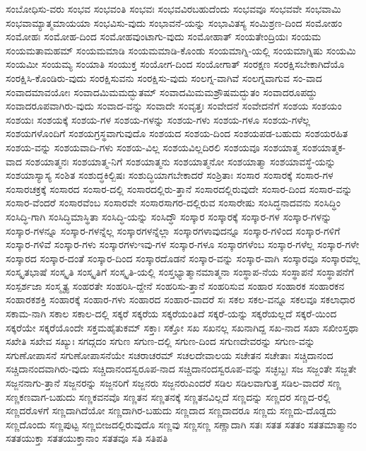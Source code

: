 {ಸಂಬೋಧಿಸು-ವರು
ಸಂಭವ
ಸಂಭವಂತಿ
ಸಂಭವಃ
ಸಂಭವವಿರಬಹುದೆಂದು
ಸಂಭವವೂ
ಸಂಭವವೇ
ಸಂಭವಾಮಿ
ಸಂಭವಾಮ್ಯಾತ್ಮಮಾಯಯಾ
ಸಂಭವಿಸು-ವುದು
ಸಂಭಾವನೆ-ಯನ್ನು
ಸಂಭಾವಿತಸ್ಯ
ಸಂಮಿಶ್ರಣ-ದಿಂದ
ಸಂಮೋಹಂ
ಸಂಮೋಹಃ
ಸಂಮೋಹ-ದಿಂದ
ಸಂಮೋಹವುಂಟಾಗು-ವುದು
ಸಂಮೋಹಾತ್
ಸಂಯತೇಂದ್ರಿಯಃ
ಸಂಯಮ
ಸಂಯಮತಾಮಹಮ್
ಸಂಯಮಮಾಡಿ
ಸಂಯಮಮಾಡಿ-ಕೊಂಡು
ಸಂಯಮಾಗ್ನಿ-ಯಲ್ಲಿ
ಸಂಯಮಾಗ್ನಿಷು
ಸಂಯಮಿ
ಸಂಯಮೀ
ಸಂಯಮ್ಯ
ಸಂಯಾತಿ
ಸಂಯುಕ್ತ
ಸಂಯೋಗ-ದಿಂದ
ಸಂಯೋಗಾತ್
ಸಂರಕ್ಷಣ
ಸಂರಕ್ಷಿಸಬೇಕಾಗಿದೆಯೊ
ಸಂರಕ್ಷಿಸಿ-ಕೊಂಡಿರು-ವುದು
ಸಂರಕ್ಷಿಸುವನು
ಸಂರಕ್ಷಿಸು-ವುದು
ಸಂಲಗ್ನ-ವಾಗಿವೆ
ಸಂಲಗ್ನವಾಗುವ
ಸಂ-ವಾದ
ಸಂವಾದಮಾವಯೋಃ
ಸಂವಾದಮಿಮಮದ್ಭುತಮ್
ಸಂವಾದಮಿಮಮಶ್ರೌಷಮದ್ಭುತಂ
ಸಂವಾದರೂಪದ್ದು
ಸಂವಾದರೂಪವಾಗಿರು-ವುದು
ಸಂವಾದ-ವನ್ನು
ಸಂವಾದೇ
ಸಂವೃತ್ತಃ
ಸಂವೇದನೆ
ಸಂವೇದನೆಗೆ
ಸಂಶಯ
ಸಂಶಯಂ
ಸಂಶಯಃ
ಸಂಶಯಕ್ಕೆ
ಸಂಶಯ-ಗಳ
ಸಂಶಯ-ಗಳನ್ನು
ಸಂಶಯ-ಗಳು
ಸಂಶಯ-ಗಳೂ
ಸಂಶಯ-ಗಳೆಲ್ಲ
ಸಂಶಯಗಳೊಂದಿಗೆ
ಸಂಶಯಗ್ರಸ್ಥವಾಗುವುದೊ
ಸಂಶಯದ
ಸಂಶಯ-ದಿಂದ
ಸಂಶಯಪಡ-ಬಹುದು
ಸಂಶಯರಹಿತ
ಸಂಶಯ-ವನ್ನು
ಸಂಶಯವಾದಿ-ಗಳು
ಸಂಶಯ-ವಿಲ್ಲ
ಸಂಶಯವಿಲ್ಲದಿರಲಿ
ಸಂಶಯವೂ
ಸಂಶಯಾತ್ಮ
ಸಂಶಯಾತ್ಮಕ-ವಾದ
ಸಂಶಯಾತ್ಮನಃ
ಸಂಶಯಾತ್ಮ-ನಿಗೆ
ಸಂಶಯಾತ್ಮನು
ಸಂಶಯಾತ್ಮನೋ
ಸಂಶಯಾತ್ಮಾ
ಸಂಶಯಾವಸ್ಥೆ-ಯನ್ನು
ಸಂಶಯಾಸ್ಯಾಸ್ಯ
ಸಂಶಿತ
ಸಂಶುದ್ಧಕಿಲ್ಬಿಷಃ
ಸಂಶುದ್ಧಿಯಾಗಬೇಕಾದರೆ
ಸಂಶ್ರಿತಾಃ
ಸಂಸಾರ
ಸಂಸಾರಕ್ಕೆ
ಸಂಸಾರ-ಗಳ
ಸಂಸಾರಚಕ್ರಕ್ಕೆ
ಸಂಸಾರದ
ಸಂಸಾರ-ದಲ್ಲಿ
ಸಂಸಾರದಲ್ಲಿರು-ತ್ತಾನೆ
ಸಂಸಾರದಲ್ಲಿರುವುದೇ
ಸಂಸಾರ-ದಿಂದ
ಸಂಸಾರ-ವನ್ನು
ಸಂಸಾರ-ವೆಂದರೆ
ಸಂಸಾರವೆಂಬ
ಸಂಸಾರವೇ
ಸಂಸಾರಸಾಗರ-ದಲ್ಲಿರುವ
ಸಂಸಾರೇಷು
ಸಂಸಿದ್ಧನಾದವನು
ಸಂಸಿದ್ಧಿಂ
ಸಂಸಿದ್ಧಿ-ಗಾಗಿ
ಸಂಸಿದ್ಧಿಮಾಸ್ಥಿತಾ
ಸಂಸಿದ್ಧಿ-ಯನ್ನು
ಸಂಸಿದ್ಧೌ
ಸಂಸ್ಕಾರ
ಸಂಸ್ಕಾರಕ್ಕೆ
ಸಂಸ್ಕಾರ-ಗಳ
ಸಂಸ್ಕಾರ-ಗಳನ್ನು
ಸಂಸ್ಕಾರ-ಗಳನ್ನೂ
ಸಂಸ್ಕಾರ-ಗಳನ್ನೆಲ್ಲ
ಸಂಸ್ಕಾರಗಳನ್ನೆಲ್ಲಾ
ಸಂಸ್ಕಾರಗಳಾವುದನ್ನೂ
ಸಂಸ್ಕಾರ-ಗಳಿಂದ
ಸಂಸ್ಕಾರ-ಗಳಿಗೆ
ಸಂಸ್ಕಾರ-ಗಳಿವೆ
ಸಂಸ್ಕಾರ-ಗಳು
ಸಂಸ್ಕಾರಗಳುಇವು-ಗಳ
ಸಂಸ್ಕಾರ-ಗಳೂ
ಸಂಸ್ಕಾರಗಳೆಂಬ
ಸಂಸ್ಕಾರ-ಗಳೆಲ್ಲ
ಸಂಸ್ಕಾರ-ಗಳೇ
ಸಂಸ್ಕಾರದ
ಸಂಸ್ಕಾರ-ದಂತೆ
ಸಂಸ್ಕಾರ-ದಿಂದ
ಸಂಸ್ಕಾರದೊಡನೆ
ಸಂಸ್ಕಾರ-ವನ್ನು
ಸಂಸ್ಕಾರ-ವಾಗಿ
ಸಂಸ್ಕಾರವೂ
ಸಂಸ್ಕಾರವೆಲ್ಲ
ಸಂಸ್ಕೃತಭಾಷೆ
ಸಂಸ್ಕೃತಿ
ಸಂಸ್ಕೃತಿಗೆ
ಸಂಸ್ಕೃತಿ-ಯಲ್ಲಿ
ಸಂಸ್ತಭ್ಯಾತ್ಮಾನಮಾತ್ಮನಾ
ಸಂಸ್ಥಾಪ-ನೆಯ
ಸಂಸ್ಥಾಪನೆ
ಸಂಸ್ಥಾಪನೆಗೆ
ಸಂಸ್ಪರ್ಶಜಾ
ಸಂಸ್ಮೃತ್ಯ
ಸಂಹರತೇ
ಸಂಹರಿಸಿ-ದ್ದೇನೆ
ಸಂಹರಿಸು-ತ್ತಾನೆ
ಸಂಹರಿಸುವ
ಸಂಹಾರ
ಸಂಹಾರಕ
ಸಂಹಾರಕನ
ಸಂಹಾರಕಶಕ್ತಿ
ಸಂಹಾರಕ್ಕೆ
ಸಂಹಾರ-ಗಳು
ಸಂಹಾರದ
ಸಂಹಾರ-ವಾದರೆ
ಸಃ
ಸಕಲ
ಸಕಲ-ವನ್ನೂ
ಸಕಲವೂ
ಸಕಲಾಧಾರ
ಸಕಾಮ-ನಾಗಿ
ಸಕಾಲ
ಸಕಾಲ-ದಲ್ಲಿ
ಸಕ್ಕರೆ
ಸಕ್ಕರೆಯ
ಸಕ್ಕರೆಯಂತಿದೆ
ಸಕ್ಕರೆ-ಯನ್ನು
ಸಕ್ಕರೆಯಲ್ಲದೆ
ಸಕ್ಕರೆ-ಯಿಂದ
ಸಕ್ಕರೆಯೇ
ಸಕ್ಕರೆಯೊಂದೇ
ಸಕ್ತಮಹೈತುಕಮ್
ಸಕ್ತಾಃ
ಸಕ್ತೋ
ಸಖ
ಸಖನಲ್ಲ
ಸಖನಾಗಿದ್ದ
ಸಖ-ನಾದ
ಸಖಾ
ಸಖೀಂಸ್ತಥಾ
ಸಖೇತಿ
ಸಖೇವ
ಸಖ್ಯುಃ
ಸಗದ್ಗದಂ
ಸಗುಣ
ಸಗುಣ-ದಲ್ಲಿ
ಸಗುಣ-ದಿಂದ
ಸಗುಣದೇವರನ್ನು
ಸಗುಣ-ವನ್ನು
ಸಗುಣೋಪಾಸನೆ
ಸಗುಣೋಪಾಸನೆಯೇ
ಸಚರಾಚರಮ್
ಸಚಲದೇವಾಲಯ
ಸಚೇತನ
ಸಚೇತಾಃ
ಸಚ್ಚಿದಾನಂದ
ಸಚ್ಚಿದಾನಂದವಾಗಿರು-ವುದು
ಸಚ್ಚಿದಾನಂದಸ್ವರೂಪ-ನಾದ
ಸಚ್ಚಿದಾನಂದಸ್ವರೂಪ-ವನ್ನು
ಸಚ್ಛಬ್ದಃ
ಸಜ
ಸಜ್ಜಂತೇ
ಸಜ್ಜತೇ
ಸಜ್ಜನನಾಗು-ತ್ತಾನೆ
ಸಜ್ಜನರನ್ನು
ಸಜ್ಜನರಿಗೆ
ಸಜ್ಜನರು
ಸಜ್ಜನರುಎಂದರೆ
ಸಡಿಲ
ಸಡಿಲವಾಗುತ್ತ
ಸಡಿಲ-ವಾದರೆ
ಸಣ್ಣ
ಸಣ್ಣಕಣವಾಗ-ಬಹುದು
ಸಣ್ಣಕವನವೊ
ಸಣ್ಣತನ
ಸಣ್ಣತನಕ್ಕೆ
ಸಣ್ಣತನವಿಲ್ಲದೆ
ಸಣ್ಣದನ್ನು
ಸಣ್ಣದರ
ಸಣ್ಣದ-ರಲ್ಲಿ
ಸಣ್ಣದರೊಳಗೆ
ಸಣ್ಣದಾಗಿದೆಯೋ
ಸಣ್ಣದಾಗಿರ-ಬಹುದು
ಸಣ್ಣದಾದ
ಸಣ್ಣದಾದರೂ
ಸಣ್ಣದು
ಸಣ್ಣದು-ದೊಡ್ಡದು
ಸಣ್ಣದೊಂದು
ಸಣ್ಣಪುಟ್ಟ
ಸಣ್ಣಬೀಜದಲ್ಲಿರುವುದೊ
ಸಣ್ಣವು
ಸಣ್ಣಸಣ್ಣ
ಸಣ್ಣಾದಾಗಿ
ಸತಃ
ಸತತ
ಸತತಂ
ಸತತಮಾತ್ಮಾನಂ
ಸತತಯುಕ್ತಾ
ಸತತಯುಕ್ತಾನಾಂ
ಸತತವೂ
ಸತಿ
ಸತಿಪತಿ
}
